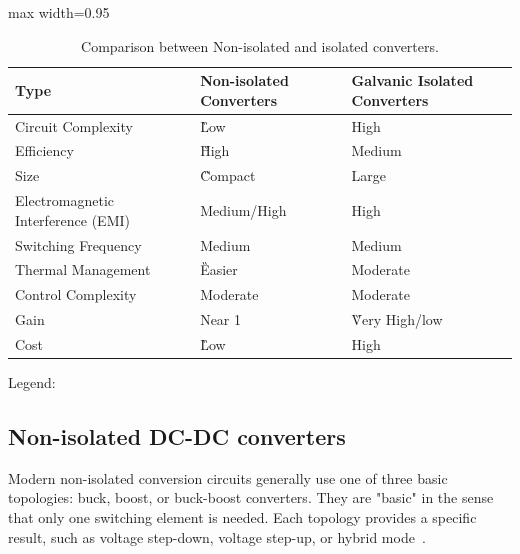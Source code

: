         \begin{table}[htbp]
            \centering
            \caption{Comparison between Non-isolated and isolated converters.}
            \label{tab:switching-vs-isolated-converters}
            \scriptsize
            \setlength{\tabcolsep}{5pt}
            \renewcommand{\arraystretch}{1.1}
            \begin{adjustbox}{max width=0.95\textwidth}
                \begin{tabularx}{\textwidth}{>{\raggedright\arraybackslash}p{4cm}
                                            >{\centering\arraybackslash}X
                                            >{\centering\arraybackslash}X}
                \toprule
                Type & Non-isolated Converters & Galvanic Isolated Converters \\
                \midrule

                Circuit Complexity & \G Low & \R High \\
                Efficiency & \G High & \Y Medium \\
                Size & \G Compact & \R Large \\
                Electromagnetic Interference (EMI) & \Y Medium/High &  \R High\\
                Switching Frequency & \Y Medium & \Y Medium \\
                Thermal Management & \G Easier & \Y Moderate \\
                Control Complexity & \Y Moderate & \Y Moderate \\
                Gain & \Y Near 1 & \G Very High/low \\
                Cost & \G Low & \R High \\
                \bottomrule
                \end{tabularx}
            \end{adjustbox}
            \begin{center}
                Legend:   
            \end{center}
        \end{table}

        
        

        
            


    \subsection{Non-isolated DC-DC converters}
        Modern non-isolated conversion circuits generally use one of three basic topologies: buck, boost, or buck-boost converters. They are "basic" in the sense that only one switching element is needed. Each topology provides a specific result, such as voltage step-down, voltage step-up, or hybrid mode~\cite{Comparison_PV_Converter_Technologies_1989}. 

